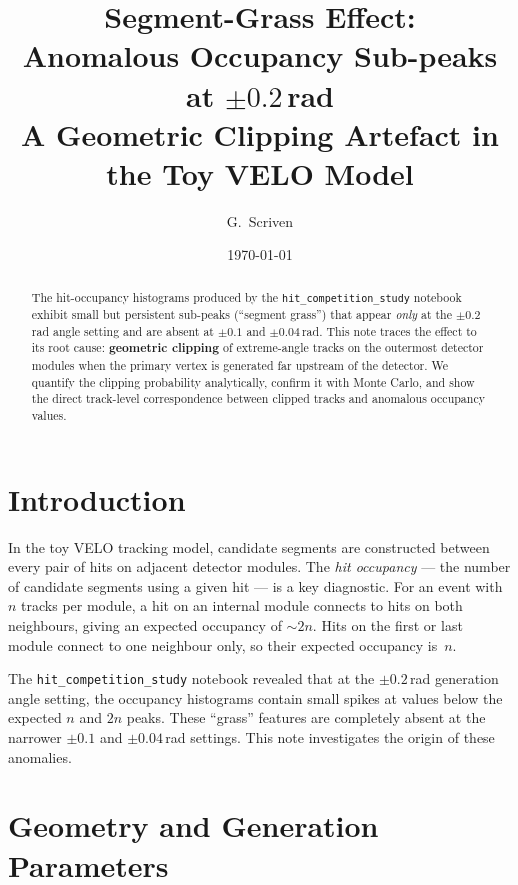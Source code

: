 \documentclass[11pt,a4paper]{article}
\title{Segment-Grass Effect:\\
       Anomalous Occupancy Sub-peaks at \boldmath$\pm 0.2$\,rad\\[4pt]
       \large A Geometric Clipping Artefact in the Toy VELO Model}
\author{G.\ Scriven}
\date{\today}
\begin{document}
\maketitle

\begin{abstract}
The hit-occupancy histograms produced by the \texttt{hit\_competition\_study}
notebook exhibit small but persistent sub-peaks (``segment grass'') that
appear \emph{only} at the $\pm 0.2$\,rad angle setting and are absent at
$\pm 0.1$ and $\pm 0.04$\,rad.  This note traces the effect to its root
cause: \textbf{geometric clipping} of extreme-angle tracks on the outermost
detector modules when the primary vertex is generated far upstream of the
detector.  We quantify the clipping probability analytically, confirm it
with Monte Carlo, and show the direct track-level correspondence between
clipped tracks and anomalous occupancy values.
\end{abstract}

\section{Introduction}
\label{sec:intro}

In the toy VELO tracking model, candidate segments are constructed between
every pair of hits on adjacent detector modules.  The \emph{hit occupancy}
--- the number of candidate segments using a given hit --- is a key
diagnostic.  For an event with $n$ tracks per module, a hit on an internal
module connects to hits on both neighbours, giving an expected occupancy of
$\sim 2n$.  Hits on the first or last module connect to one neighbour only,
so their expected occupancy is~$n$.

The \texttt{hit\_competition\_study} notebook revealed that at the
$\pm 0.2$\,rad generation angle setting, the occupancy histograms contain
small spikes at values below the expected $n$ and $2n$ peaks.  These
``grass'' features are completely absent at the narrower $\pm 0.1$ and
$\pm 0.04$\,rad settings.  This note investigates the origin of these
anomalies.

\section{Geometry and Generation Parameters}
\label{sec:geometry}
\end{document}
